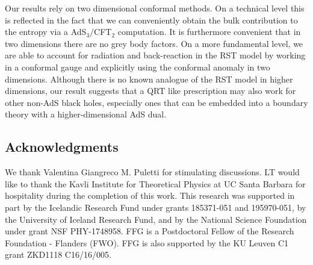 \documentclass[12pt,a4paper]{article}
\begin{document}
Our results rely on two dimensional conformal methods. On a technical level this is reflected in the fact that we can conveniently obtain the bulk contribution to the entropy via a AdS$_{3}/$CFT$_{2}$ computation. It is furthermore convenient that in two dimensions there are no grey body factors. On a more fundamental level, we are able to account for radiation and back-reaction in the RST model by working in a conformal gauge and explicitly using the conformal anomaly in two dimensions. Although there is no known analogue of the RST model in higher dimensions, our result suggests that a QRT like prescription may also work for other non-AdS black holes, especially ones that can be embedded into a boundary theory with a higher-dimensional AdS dual.


\subsection*{Acknowledgments}
We thank Valentina Giangreco M. Puletti for stimulating discussions.
LT would like to thank the Kavli Institute for Theoretical Physics at UC Santa Barbara for hospitality during the completion of this work.  This research was supported in part by the Icelandic Research Fund under grants 185371-051 and 195970-051, by the University of Iceland Research Fund, and by the National Science Foundation under grant NSF PHY-1748958. FFG is a Postdoctoral Fellow of the Research Foundation - Flanders (FWO). FFG is also supported by the KU Leuven C1 grant ZKD1118 C16/16/005.




\end{document}

